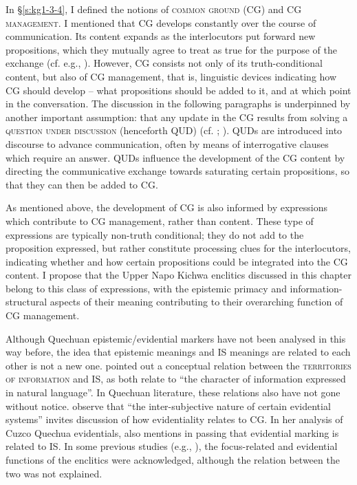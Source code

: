 \documentclass[output=paper]{langscibook}
\begin{document}
In §‎\ref{s:kg1-3-4}, I defined the notions of \textsc{common ground} (CG) and CG \textsc{management}. I mentioned that CG develops constantly over the course of communication. Its content expands as the interlocutors put forward new propositions, which they mutually agree to treat as true for the purpose of the exchange (cf. e.g., \citealt{Stalnaker1974}). However, CG consists not only of its truth-conditional content, but also of CG management, that is, linguistic devices indicating how CG should develop – what propositions should be added to it, and at which point in the conversation. The discussion in the following paragraphs is underpinned by another important assumption: that any update in the CG results from solving a \textsc{question under discussion} (henceforth QUD) (cf. \citealt{Asher1993}; \citealt{Matic2015}). QUDs are introduced into discourse to advance communication, often by means of interrogative clauses which require an answer. QUDs influence the development of the CG content by directing the communicative exchange towards saturating certain propositions, so that they can then be added to CG.

As mentioned above, the development of CG is also informed by expressions which contribute to CG management, rather than content. These type of expressions are typically non-truth conditional; they do not add to the proposition expressed, but rather constitute processing clues for the interlocutors, indicating whether and how certain propositions could be integrated into the CG content. I propose that the Upper Napo Kichwa enclitics discussed in this chapter belong to this class of expressions, with the epistemic primacy and information-structural aspects of their meaning contributing to their overarching function of CG management.

Although Quechuan epistemic/evidential markers have not been analysed in this way before, the idea that epistemic meanings and IS meanings are related to each other is not a new one. \cite[3]{Kamio1997} pointed out a conceptual relation between the \textsc{territories of information} and IS, as both relate to “the character of information expressed in natural language”. In Quechuan literature, these relations also have not gone without notice. \cite{Hintz2017} observe that “the inter-subjective nature of certain evidential systems” invites discussion of how evidentiality relates to CG. In her analysis of Cuzco Quechua evidentials, \cite{Faller2002} also mentions in passing that evidential marking is related to IS. In some previous studies (e.g., \citealt{Muysken1995}), the focus-related and evidential functions of the enclitics were acknowledged, although the relation between the two was not explained.
\end{document}
